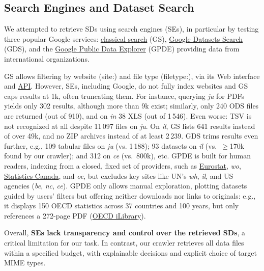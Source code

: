 \subsection{Search Engines and Dataset Search}
\label{subsubsection:search_engines}

We attempted to retrieve SDs using search engines (SEs), in particular by testing three popular Google services:
\href{https://www.google.com/}{classical search} (GS), \href{https://datasetsearch.research.google.com/}{Google Datasets Search} (GDS), and the \href{https://www.google.com/publicdata/directory}{Google Public Data Explorer} (GPDE) providing data from international
organizations.

GS allows filtering by website (\textsf{\small site:}) and file type (\textsf{\small filetype:}), via its Web interface and \href{https://programmablesearchengine.google.com/}{API}. However, SEs, including Google, do not fully index websites and GS caps results at 1k, often truncating them. 
For instance, querying \emph{ju} for PDFs yields only 302 results, although more than 9k exist; similarly, only 240 ODS files are returned (out of 910), and on \emph{in} 38 XLS (out of 1\,546). Even worse: TSV is not recognized at all despite 11\,097 files on \emph{ju}. On \emph{il}, GS lists 641 results instead of over 49k, and no ZIP archives instead of at least 2\,239.
GDS trims results even further, e.g., 109 tabular files on
\emph{ju} (vs. 1\,188); 93 datasets on \emph{il} (vs.\ $\geq$170k found by our crawler); and 312 on \emph{ce} (vs.\ 800k), etc. 
GPDE is built for human readers, indexing from a closed, fixed set of providers, such as \href{https://ec.europa.eu/eurostat/}{Eurostat}, \emph{wo}, \href{https://www.statcan.gc.ca/}{Statistics Canada}, and \emph{oe}, but excludes key sites like UN’s \emph{wh}, \emph{il}, and US agencies (\emph{be}, \emph{nc}, \emph{ce}).	
GPDE only allows manual exploration, plotting datasets guided by users' filters but offering neither downloads nor links to originals: e.g., it displays 150 OECD statistics across 37 countries and 100 years, but only references a 272-page PDF (\href{https://www.oecd-ilibrary.org/}{OECD iLibrary}).  


Overall, \textbf{SEs lack transparency and control over the retrieved SDs}, a critical limitation for our task. In contrast, our crawler retrieves all data files within a specified budget, with explainable decisions and explicit choice of target MIME types.